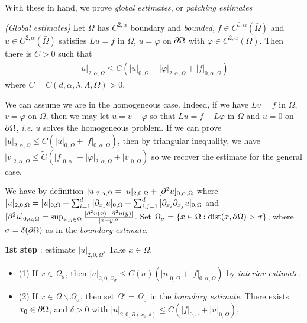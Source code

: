\documentclass[12pt,a4paper]{article}
\newenvironment{proof}
{\begin{changemargin}{0.5cm}{0.5cm} 
	}%
	{\end{changemargin}
}
\renewenvironment{i}
{\begin{itemize} 
	}%
	{\end{itemize}
}
\newenvironment{p}
{\begin{proof} 
	}%
	{\end{proof}
}
\begin{document}
With these in hand, we prove \emph{global estimates}, or \emph{patching estimates}

\s

\thm \emph{(Global estimates)} Let $\Omega$ has $C^{2, \alpha}$ boundary and \emph{bounded}, $f\in C^{0, \alpha}(\bar{\Omega})$ and $u\in C^{2, \alpha}(\bar{\Omega})$ satisfies $Lu =f$ in $\Omega$, $u = \varphi$ on $\partial \Omega$ with $\varphi \in C^{2, \alpha}(\Omega)$. Then there is $C >0$ such that
\begin{align*}
|u|_{2, \alpha, \Omega} \leq C (|u|_{0, \Omega} + |\varphi|_{2, \alpha, \Omega} + |f|_{0, \alpha, \Omega})
\end{align*}
where $C = C(d, \alpha, \lambda, \Lambda, \Omega)>0$.
\begin{p}
\pf We can assume we are in the homogeneous case. Indeed, if we have $Lv = f$ in $\Omega$, $v=\varphi$ on $\Omega$, then we may let $u = v- \varphi$ so that $Lu =f- L\varphi$ in $\Omega$ and $u=0$ on $\partial \Omega$, \textit{i.e.} $u$ solves the homogeneous problem. If we can prove $|u|_{2, \alpha, \Omega} \leq C(|u|_{0, \Omega} + |f|_{0, \alpha, \Omega})$, then by triangular inequality, we have $|v|_{2, \alpha, \Omega} \leq \tilde{C}(|f|_{0, \alpha, }+ |\varphi|_{2, \alpha, \Omega} + |v|_{0, \Omega})$ so we recover the estimate for the general case.
\s

We have by definition $|u|_{2, \alpha, \Omega} = |u|_{2, 0,\Omega} + [\partial^2 u]_{0, \alpha,\Omega}$ where $|u|_{2, 0, \Omega} = |u|_{0, \Omega}+ \sum_{i=1}^d |\partial_{x_i} u|_{0, \Omega} + \sum_{i,j=1}^d |\partial_{x_i} \partial_{x_j} u|_{0, \Omega}$ and $[\partial^2 u]_{0, \alpha, \Omega} = \sup_{x,y\in \Omega} \frac{|\partial^2 u(x) - \partial^2 u(y)|}{|x-y|^{\alpha}}$. Set $\Omega_{\sigma} = \{x\in \Omega : \text{dist}(x, \partial \Omega) > \sigma \}$, where $\sigma = \delta (\partial \Omega)$ as in the \emph{boundary estimate}.

\s

\textbf{1st step} : estimate $|u|_{2, 0, \Omega}$. Take $x\in \Omega$,
\begin{i}
\item[(1)] If $x\in \Omega_{\sigma}$, then $|u|_{2,0, \Omega_{\sigma}}\leq C(\sigma)(|u|_{0, \Omega} + |f|_{0, \alpha, \Omega})$ by \emph{interior estimate}.
\item[(2)] If $x\in \Omega \backslash \Omega_{\sigma}$, then set $\Omega' = \Omega_{\sigma}$ in the \emph{boundary estimate}. There exists $x_0 \in \partial \Omega$, and $\delta>0$ with $|u|_{2, 0, B(x_0, \delta)} \leq C (|f|_{0, \alpha} + |u|_{0, \Omega})$.
\end{i}
\s


\end{p}
\end{document}
